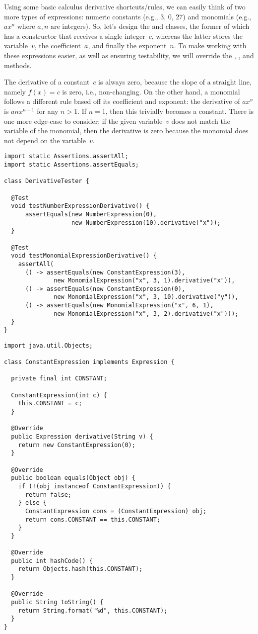 Using some basic calculus derivative shortcuts/rules, we can easily think of two more types of expressions: numeric constants (e.g., $3$, $0$, $27$) and monomials (e.g., $ax^n$ where $a, n$ are integers). 
So, let's design the  and  classes, the former of which has a constructor that receives a single integer~$c$, whereas the latter stores the variable~$v$, the coefficient~$a$, and finally the exponent~$n$. 
To make working with these expressions easier, as well as ensuring testability, we will override the , , and  methods.

The derivative of a constant~$c$ is always zero, because the slope of a straight line, namely $f(x) = c$ is zero, i.e., non-changing. 
On the other hand, a monomial follows a different rule based off its coefficient and exponent: the derivative of $ax^n$ is $anx^{n-1}$ for any $n > 1$. 
If $n=1$, then this trivially becomes a constant. 
There is one more edge-case to consider: if the given variable~$v$ does not match the variable of the monomial, then the derivative is zero because the monomial does not depend on the variable~$v$.

\begin{lstlisting}[language=MyJava]
import static Assertions.assertAll;
import static Assertions.assertEquals;

class DerivativeTester {

  @Test
  void testNumberExpressionDerivative() {
      assertEquals(new NumberExpression(0),
                   new NumberExpression(10).derivative("x"));
  }

  @Test
  void testMonomialExpressionDerivative() {
    assertAll(
      () -> assertEquals(new ConstantExpression(3),
              new MonomialExpression("x", 3, 1).derivative("x")),
      () -> assertEquals(new ConstantExpression(0),
              new MonomialExpression("x", 3, 10).derivative("y")),
      () -> assertEquals(new MonomialExpression("x", 6, 1),
              new MonomialExpression("x", 3, 2).derivative("x")));
  }
}
\end{lstlisting}

\begin{lstlisting}[language=MyJava]
import java.util.Objects;

class ConstantExpression implements Expression {

  private final int CONSTANT;

  ConstantExpression(int c) { 
    this.CONSTANT = c; 
  }

  @Override
  public Expression derivative(String v) { 
    return new ConstantExpression(0); 
  }

  @Override
  public boolean equals(Object obj) {
    if (!(obj instanceof ConstantExpression)) { 
      return false; 
    } else { 
      ConstantExpression cons = (ConstantExpression) obj;
      return cons.CONSTANT == this.CONSTANT; 
    }
  }

  @Override
  public int hashCode() { 
    return Objects.hash(this.CONSTANT); 
  }

  @Override
  public String toString() { 
    return String.format("%d", this.CONSTANT); 
  }
}
\end{lstlisting}


